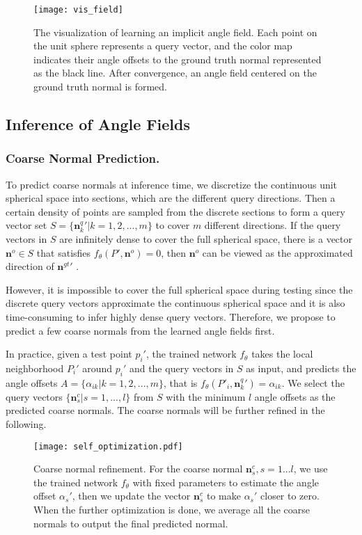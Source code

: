 \documentclass[letterpaper]{article} \usepackage{aaai23}  \usepackage{times}  \usepackage{helvet}  \usepackage{courier}  \usepackage[hyphens]{url}  \usepackage{graphicx} \urlstyle{rm} \def\UrlFont{\rm}  \usepackage{natbib}  \usepackage{caption} \frenchspacing  \setlength{\pdfpagewidth}{8.5in} \setlength{\pdfpageheight}{11in} \usepackage{algorithm}
\begin{document}
\begin{figure}[t]
\centering
\texttt{[image: vis\_field]}
\caption{The visualization of learning an implicit angle field. Each point on the unit sphere represents a query vector, and the color map indicates their angle offsets to the ground truth normal represented as the black line. After convergence, an angle field centered on the ground truth normal is formed.}
\label{fig:field visualization}
\end{figure}

\subsection{Inference of Angle Fields}


\subsubsection{Coarse Normal Prediction.}
To predict coarse normals at inference time, we discretize the continuous unit spherical space into sections, which are the different query directions. Then a certain density of points are sampled from the discrete sections to form a query vector set $S=\{{{\boldsymbol{n}}^q_k}' | k =1, 2, ... , m\}$ to cover $m$ different directions. 
If the query vectors in $S$ are infinitely dense to cover the full spherical space, there is a vector $\boldsymbol{n}^o \in S$ that satisfies $f_{\theta}(P', \boldsymbol{n}^o) = 0$, then $\boldsymbol{n}^o$ can be viewed as the approximated direction of ${\boldsymbol{n}^{gt}}'$ .


However, it is impossible to cover the full spherical space during testing since the discrete query vectors approximate the continuous spherical space and it is also time-consuming to infer highly dense query vectors. Therefore, we propose to predict a few coarse normals from the learned angle fields first.

In practice, given a test point $p_i'$, the trained network $f_{\theta}$ takes the local neighborhood $P_i'$ around $p_i'$ and the query vectors in $S$ as input, and predicts the angle offsets $ A = \{\alpha_{ik} | k = 1,2,...,m\}$, that is $f_{\theta}(P'_i, {{\boldsymbol{n}}^q_k}') = \alpha_{ik}$. We select the query vectors $\{ \boldsymbol{n}^c_s|s=1,...,l\}$ from $S$ with the minimum $l$ angle offsets as the predicted coarse normals. The coarse normals will be further refined in the following.



\begin{figure}[t]
\centering
\texttt{[image: self\_optimization.pdf]}
\caption{Coarse normal refinement. For the coarse normal $\boldsymbol{n}^c_{s},s=1...l$, we use the trained network $f_{\theta}$ with fixed parameters to estimate the angle offset $\alpha_s'$, then we update the vector $\boldsymbol{n}^c_s$ to make $\alpha_s'$ closer to zero. When the further optimization is done, we average all the coarse normals to output the final predicted normal.}
\label{fig:self-optimization}
\end{figure}
\end{document}

